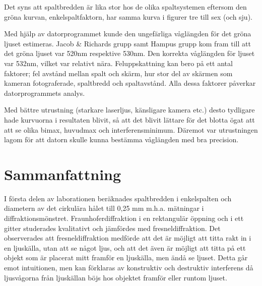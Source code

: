 \documentclass[conference]{IEEEtran}
\begin{document}
Det syns att spaltbredden är lika stor hos de olika spaltsystemen eftersom den gröna kurvan, enkelspaltfaktorn, har samma kurva i figurer tre till sex (och sju). 

Med hjälp av datorprogrammet kunde den ungefärliga våglängden för det gröna ljuset estimeras. Jacob \& Richards grupp samt Hampus grupp kom fram till att det gröna ljuset var 520nm respektive 530nm. Den korrekta våglängden för ljuset var 532nm, vilket var relativt nära. Feluppskattning kan bero på ett antal faktorer; fel avstånd mellan spalt och skärm, hur stor del av skärmen som kameran fotograferade, spaltbredd och spaltavstånd. Alla dessa faktorer påverkar datorprogrammets analys. 

Med bättre utrustning (starkare laserljus, känsligare kamera etc.) desto tydligare hade kurvuorna i resultaten blivit, så att det blivit lättare för det blotta ögat att att se olika bimax, huvudmax och interferensminimum. Däremot var utrustningen lagom för att datorn skulle kunna bestämma våglängden med bra precision. 





\section{Sammanfattning}

I första delen av laborationen beräknades spaltbredden i enkelspalten och diametern av det cirkulära hålet till 0,25 mm m.h.a. mätningar i diffraktionsmönstret. Fraunhoferdiffraktion i en rektangulär öppning och i ett gitter studerades kvalitativt och jämfördes med fresneldiffraktion. Det observerades att fresneldiffraktion medförde att det är möjligt att titta rakt in i en ljuskälla, utan att se något ljus, och att det även är möjligt att titta på ett objekt som är placerat mitt framför en ljuskälla, men ändå se ljuset. Detta går emot intuitionen, men kan förklaras av konstruktiv och destruktiv interferens då ljusvågorna från ljuskällan böjs hos objektet framför eller runtom ljuset. 
\end{document}
